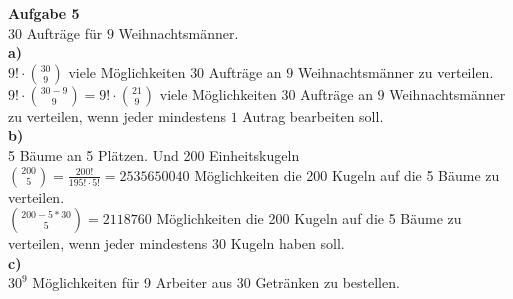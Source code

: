 \documentclass[a4paper]{scrartcl}
\begin{document}
	\begin{flushleft}
		\textbf{Aufgabe 5}\\
		$30$ Aufträge für $9$ Weihnachtsmänner.\\ 
		\textbf{a)}\\
		$9!\cdot\binom{30}{9}$ viele Möglichkeiten $30$ Aufträge an $9$ Weihnachtsmänner zu verteilen.\\
		$9!\cdot\binom{30 - 9}{9} = 9!\cdot\binom{21}{9}$ viele Möglichkeiten $30$ Aufträge an $9$ Weihnachtsmänner zu verteilen, wenn jeder mindestens $1$ Autrag bearbeiten soll.\\[1em]
		 
		\textbf{b)}\\
		5 Bäume an 5 Plätzen. Und 200 Einheitskugeln\\
		$\binom{200}{5} = \frac{200!}{195!\cdot 5!} = 2535650040$ Möglichkeiten die 200 Kugeln auf die 5 Bäume zu verteilen.\\
		$\binom{200 - 5 * 30}{5} = 2118760$ Möglichkeiten die 200 Kugeln auf die 5 Bäume zu verteilen, wenn jeder mindestens 30 Kugeln haben soll.\\

		\textbf{c)}\\
		$30^9$ Möglichkeiten für 9 Arbeiter aus 30 Getränken zu bestellen.\\
		
	\end{flushleft}
\end{document}
